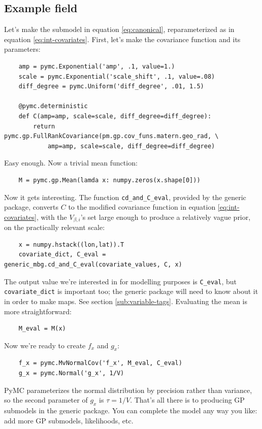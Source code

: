 \subsection{Example field}
\label{sub:example} 

Let's make the submodel in equation \ref{eq:canonical}, reparameterized as in equation \ref{eq:int-covariates}. First, let's make the covariance function and its parameters:
\begin{verbatim}
    amp = pymc.Exponential('amp', .1, value=1.)
    scale = pymc.Exponential('scale_shift', .1, value=.08)
    diff_degree = pymc.Uniform('diff_degree', .01, 1.5)
    
    @pymc.deterministic
    def C(amp=amp, scale=scale, diff_degree=diff_degree):
        return pymc.gp.FullRankCovariance(pm.gp.cov_funs.matern.geo_rad, \
            amp=amp, scale=scale, diff_degree=diff_degree)
\end{verbatim}
Easy enough. Now a trivial mean function:
\begin{verbatim}
    M = pymc.gp.Mean(lamda x: numpy.zeros(x.shape[0]))
\end{verbatim}

Now it gets interesting. The function \texttt{cd\_and\_C\_eval}, provided by the generic package, converts $C$ to the modified covariance function in equation \ref{eq:int-covariates}, with the $V_{\beta,i}$'s set large enough to produce a relatively vague prior, on the practically relevant scale:
\begin{verbatim}
    x = numpy.hstack((lon,lat)).T
    covariate_dict, C_eval = generic_mbg.cd_and_C_eval(covariate_values, C, x)
\end{verbatim}
The output value we're interested in for modelling purposes is \texttt{C\_eval}, but \texttt{covariate\_dict} is important too; the generic package will need to know about it in order to make maps. See section \ref{sub:variable-tags}. Evaluating the mean is more straightforward:
\begin{verbatim}
    M_eval = M(x)
\end{verbatim} 

Now we're ready to create $f_x$ and $g_x$:
\begin{verbatim}
    f_x = pymc.MvNormalCov('f_x', M_eval, C_eval)
    g_x = pymc.Normal('g_x', 1/V)
\end{verbatim}
PyMC parameterizes the normal distribution by precision rather than variance, so the second parameter of $g_x$ is $\tau=1/V$. That's all there is to producing GP submodels in the generic package. You can complete the model any way you like: add more GP submodels, likelihoods, etc.

